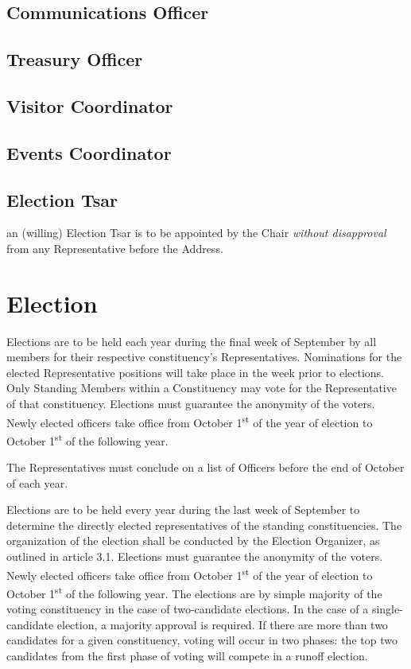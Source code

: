 \documentclass[8pt]{article}
\begin{document}
	\subsection{Communications Officer}
	\subsection{Treasury Officer}
	\subsection{Visitor Coordinator}
	\subsection{Events Coordinator}
	\subsection{Election Tsar}
	an (willing) Election Tsar is to be appointed by the Chair \textit{without disapproval} from any Representative before the Address.
	
	\section{Election}\label{sec:elections}
	Elections are to be held each year during the final week of September by all members for their respective constituency's Representatives. Nominations for the elected Representative positions will take place in the week prior to elections. Only Standing Members within a Constituency may vote for the Representative of that constituency. Elections must guarantee the anonymity of the voters. Newly elected officers take office from October 1\textsuperscript{st} of the year of election to October 1\textsuperscript{st} of the following year.
	
	The Representatives must conclude on a list of Officers before the end of October of each year.
	
	Elections are to be held every year during the last week of September to determine the directly elected representatives of the standing constituencies.  The organization of the election shall be conducted by the Election Organizer, as outlined in article 3.1.  Elections must guarantee the anonymity of the voters. Newly elected officers take office from October 1\textsuperscript{st} of the year of election to October 1\textsuperscript{st} of the following year. The elections are by simple majority of the voting constituency in the case of two-candidate elections. In the case of a single-candidate election, a majority approval is required. If there are more than two candidates for a given constituency, voting will occur in two phases: the top two candidates from the first phase of voting will compete in a runoff election.
	
\end{document}
